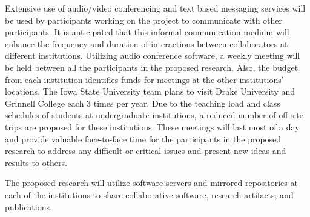 \documentclass[11pt]{article}
\begin{document}
       
      Extensive use of audio/video conferencing and text based messaging services will be used by participants working on the project to communicate with other participants.
      It is anticipated that this informal communication medium will enhance the frequency and duration of interactions between collaborators at different institutions.
      Utilizing audio conference software, a weekly meeting will be held between all the participants in the proposed research.
      Also, the budget from each institution identifies funds for meetings at the other institutions' locations.
      The Iowa State University team plans to visit Drake University and Grinnell College each 3 times per year.
      Due to the teaching load and class schedules of students at undergraduate institutions, a reduced number of off-site trips are proposed for these institutions.
      These meetings will last most of a day and provide valuable face-to-face time for the participants in the proposed research to address any difficult or critical issues and present new ideas and results to others.
    
      The proposed research will utilize software servers and mirrored repositories at each of the institutions to share collaborative software, research artifacts, and publications.
    
\end{document}
